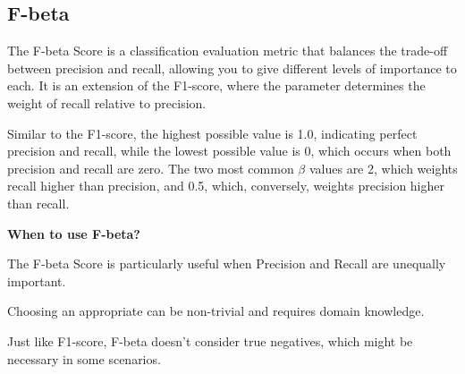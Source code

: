 \subsection{F-beta}

The F-beta Score is a classification evaluation metric that balances the trade-off between precision and recall, allowing you to give different levels of importance to each.
It is an extension of the F1-score, where the parameter  determines the weight of recall relative to precision.

\begin{center}
\end{center}

Similar to the F1-score, the highest possible value is 1.0, indicating perfect precision and recall, while the lowest possible value is 0, which occurs when both precision and recall are zero.
The two most common $\beta$ values are 2, which weights recall higher than precision, and 0.5, which, conversely, weights precision higher than recall.

\textbf{When to use F-beta?}

The F-beta Score is particularly useful when Precision and Recall are unequally important.

{
\item Choosing an appropriate can be non-trivial and requires domain knowledge.
\item Just like F1-score, F-beta doesn't consider true negatives, which might be necessary in some scenarios.
}

